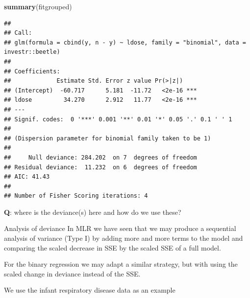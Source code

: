 \documentclass[
  ignorenonframetext,
]{beamer}
\newenvironment{Shaded}{\begin{snugshade}}{\end{snugshade}}
\newcommand{\FunctionTok}[1]{\textcolor[rgb]{0.13,0.29,0.53}{\textbf{#1}}}
\newcommand{\NormalTok}[1]{#1}
\begin{document}
\begin{frame}[fragile]
\footnotesize

\begin{Shaded}
\begin{Highlighting}[]
\FunctionTok{summary}\NormalTok{(fitgrouped)}
\end{Highlighting}
\end{Shaded}

\begin{verbatim}
## 
## Call:
## glm(formula = cbind(y, n - y) ~ ldose, family = "binomial", data = investr::beetle)
## 
## Coefficients:
##             Estimate Std. Error z value Pr(>|z|)    
## (Intercept)  -60.717      5.181  -11.72   <2e-16 ***
## ldose         34.270      2.912   11.77   <2e-16 ***
## ---
## Signif. codes:  0 '***' 0.001 '**' 0.01 '*' 0.05 '.' 0.1 ' ' 1
## 
## (Dispersion parameter for binomial family taken to be 1)
## 
##     Null deviance: 284.202  on 7  degrees of freedom
## Residual deviance:  11.232  on 6  degrees of freedom
## AIC: 41.43
## 
## Number of Fisher Scoring iterations: 4
\end{verbatim}

\normalsize

\textbf{Q}: where is the deviance(s) here and how do we use these?
\end{frame}

\begin{frame}
\begin{block}{Analysis of deviance}
\protect\hypertarget{analysis-of-deviance}{}
In MLR we have seen that we may produce a sequential analysis of
variance (Type I) by adding more and more terms to the model and
comparing the scaled decrease in SSE by the scaled SSE of a full model.

For the binary regression we may adapt a similar strategy, but with
using the scaled change in deviance instead of the SSE.

We use the infant respiratory disease data as an example
\end{block}
\end{frame}
\end{document}

